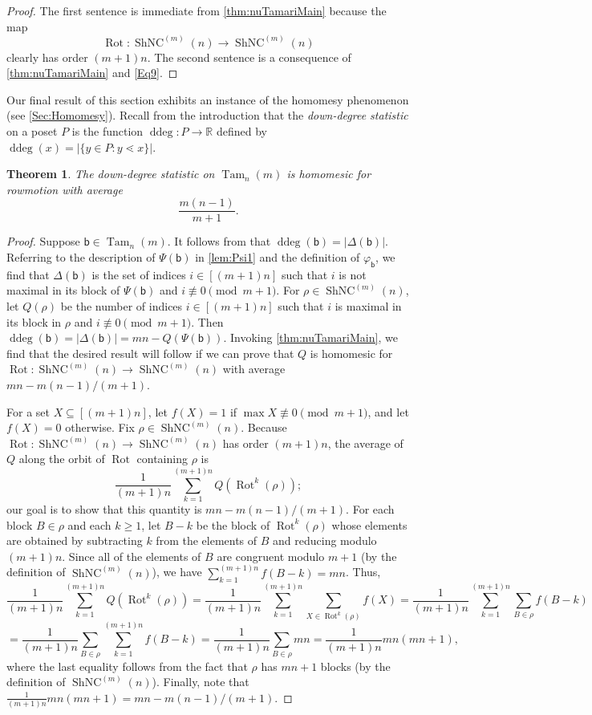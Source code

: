 \documentclass[11pt]{amsart}
\newtheorem{theorem}{Theorem}[section]
\theoremstyle{definition}
\DeclareMathOperator{\ddeg}{ddeg}
\DeclareMathOperator{\ShNC}{ShNC}
\DeclareMathOperator{\Tam}{Tam}
\DeclareMathOperator{\Rot}{Rot}
\begin{document}
\begin{proof}
The first sentence is immediate from \cref{thm:nuTamariMain} because the map \[\Rot\colon\ShNC^{(m)}(n)\to\ShNC^{(m)}(n)\] clearly has order $(m+1)n$. The second sentence is a consequence of \cref{thm:nuTamariMain} and \eqref{Eq9}. 
\end{proof}

Our final result of this section exhibits an instance of the homomesy phenomenon (see \cref{Sec:Homomesy}). Recall from the introduction that the \emph{down-degree statistic} on a poset $P$ is the function $\ddeg\colon P\to\mathbb R$ defined by $\ddeg(x)=\lvert\{y\in P:y\lessdot x\}\rvert$. 

\begin{theorem}\label{thm:homomesy}
The down-degree statistic on $\Tam_n(m)$ is homomesic for rowmotion with average \[\frac{m(n-1)}{m+1}.\] 
\end{theorem}

\begin{proof}
Suppose $\mathsf b\in\Tam_n(m)$. It follows from \cite[Proposition~4.4]{DefantMeeting} that $\ddeg(\mathsf b)=|\Delta(\mathsf b)|$. Referring to the description of $\Psi(\mathsf b)$ in \cref{lem:Psi1} and the definition of $\varphi_{\mathsf b}$, we find that $\Delta(\mathsf b)$ is the set of indices $i\in[(m+1)n]$ such that $i$ is not maximal in its block of $\Psi(\mathsf b)$ and $i\not\equiv 0\pmod{m+1}$. For $\rho\in\ShNC^{(m)}(n)$, let $Q(\rho)$ be the number of indices $i\in[(m+1)n]$ such that $i$ is maximal in its block in $\rho$ and $i\not\equiv 0\pmod{m+1}$. Then $\ddeg(\mathsf b)=|\Delta(\mathsf b)|=mn-Q(\Psi(\mathsf b))$. Invoking \cref{thm:nuTamariMain}, we find that the desired result will follow if we can prove that $Q$ is homomesic for $\Rot\colon\ShNC^{(m)}(n)\to\ShNC^{(m)}(n)$ with average $mn-m(n-1)/(m+1)$.      

For a set $X\subseteq[(m+1)n]$, let $f(X)=1$ if $\max X\not\equiv 0\pmod{m+1}$, and let $f(X)=0$ otherwise. Fix $\rho\in\ShNC^{(m)}(n)$. Because $\Rot\colon\ShNC^{(m)}(n)\to \ShNC^{(m)}(n)$ has order $(m+1)n$, the average of $Q$ along the orbit of $\Rot$ containing $\rho$ is \[\frac{1}{(m+1)n}\sum_{k=1}^{(m+1)n}Q(\Rot^k(\rho));\] our goal is to show that this quantity is $mn-m(n-1)/(m+1)$.
For each block $B\in\rho$ and each $k\geq 1$, let $B-k$ be the block of $\Rot^k(\rho)$ whose elements are obtained by subtracting $k$ from the elements of $B$ and reducing modulo $(m+1)n$. Since all of the elements of $B$ are congruent modulo $m+1$ (by the definition of $\ShNC^{(m)}(n)$), we have $\sum_{k=1}^{(m+1)n}f(B-k)=mn$. Thus, \[\frac{1}{(m+1)n}\sum_{k=1}^{(m+1)n}Q(\Rot^k(\rho))=\frac{1}{(m+1)n}\sum_{k=1}^{(m+1)n}\sum_{X\in\Rot^k(\rho)}f(X)=\frac{1}{(m+1)n}\sum_{k=1}^{(m+1)n}\sum_{B\in \rho}f(B-k)\] \[=\frac{1}{(m+1)n}\sum_{B\in \rho}\sum_{k=1}^{(m+1)n}f(B-k)=\frac{1}{(m+1)n}\sum_{B\in \rho}mn=\frac{1}{(m+1)n}mn(mn+1),\] where the last equality follows from the fact that $\rho$ has $mn+1$ blocks (by the definition of $\ShNC^{(m)}(n)$). Finally, note that $\frac{1}{(m+1)n}mn(mn+1)=mn-m(n-1)/(m+1)$.
\end{proof}
\end{document}
